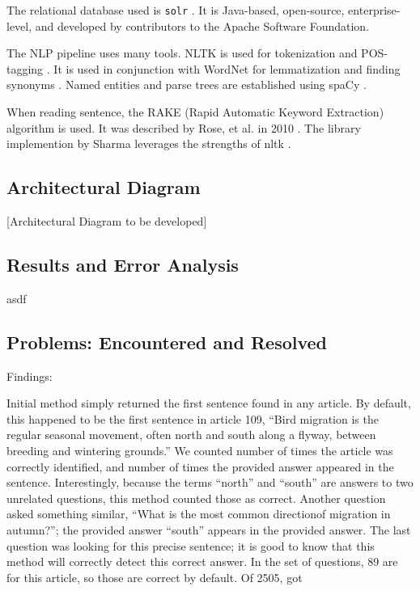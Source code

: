 \documentclass[11pt]{article}
\begin{document}
The relational database used is \texttt{solr} \cite{solr}. It is Java-based, open-source, enterprise-level, and developed by contributors to the Apache Software Foundation.

The NLP pipeline uses many tools. NLTK is used for tokenization and POS-tagging \cite{nltk}. It is used in conjunction with WordNet for lemmatization and finding synonyms \cite{wordnet}. Named entities and parse trees are established using spaCy \cite{spacy2}.

When reading sentence, the RAKE (Rapid Automatic Keyword Extraction) algorithm is used. It was described by Rose, et al. in 2010 \cite{rake1}. The library implemention by Sharma leverages the strengths of nltk \cite{rake2}.


\subsection{Architectural Diagram}

[Architectural Diagram to be developed]

\subsection{Results and Error Analysis}

asdf

\subsection{Problems: Encountered and Resolved}


Findings:

Initial method simply returned the first sentence found in any article. By default, this happened to be the first sentence in article 109, ``Bird migration is the regular seasonal movement, often north and south along a flyway, between breeding and wintering grounds.'' We counted number of times the article was correctly identified, and number of times the provided answer appeared in the sentence. Interestingly, because the terms ``north'' and ``south'' are answers to two unrelated questions, this method counted those as correct. Another question asked something similar, ``What is the most common directionof migration in autumn?''; the provided answer ``south'' appears in the provided answer. The last question was looking for this precise sentence; it is good to know that this method will correctly detect this correct answer. In the set of questions, 89 are for this article, so those are correct by default. Of 2505, got 
\end{document}
